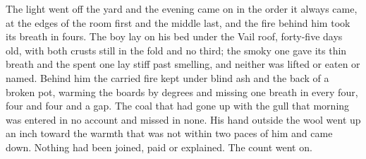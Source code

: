 The light went off the yard and the evening came on in the order it always came, at the edges of the room first and the middle last, and the fire behind him took its breath in fours. The boy lay on his bed under the Vail roof, forty-five days old, with both crusts still in the fold and no third; the smoky one gave its thin breath and the spent one lay stiff past smelling, and neither was lifted or eaten or named. Behind him the carried fire kept under blind ash and the back of a broken pot, warming the boards by degrees and missing one breath in every four, four and four and a gap. The coal that had gone up with the gull that morning was entered in no account and missed in none. His hand outside the wool went up an inch toward the warmth that was not within two paces of him and came down. Nothing had been joined, paid or explained. The count went on.

